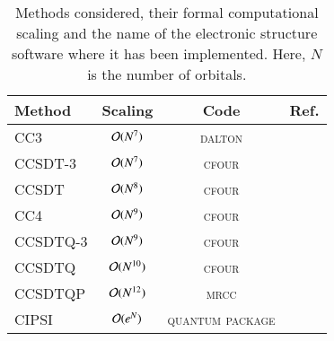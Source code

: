\documentclass[aip,jcp,reprint,noshowkeys,superscriptaddress]{revtex4-1}
\newcommand{\QP}{\textsc{quantum package}}
\newcommand{\MRCC}{\textsc{mrcc}}
\newcommand{\CFOUR}{\textsc{cfour}}
\newcommand{\DALTON}{\textsc{dalton}}
\begin{document}
\begin{table}
	\caption{Methods considered, their formal computational scaling and the name of the electronic structure software where it has been implemented.
	Here, $N$ is the number of orbitals.
	\label{tab:scaling}}
	\begin{ruledtabular}
	\begin{tabular}{lccc}
		Method	&	Scaling					&	Code		&	Ref.					\\
		\hline
		CC3			&	$\order*{N^{7}}$	&	\DALTON		&	\onlinecite{dalton}		\\
		CCSDT-3		&	$\order*{N^{7}}$	&	\CFOUR		&	\onlinecite{cfour}		\\
		CCSDT		&	$\order*{N^{8}}$	&	\CFOUR		&	\onlinecite{cfour}		\\
		CC4			&	$\order*{N^{9}}$	&	\CFOUR		&	\onlinecite{cfour}		\\
		CCSDTQ-3	&	$\order*{N^{9}}$	&	\CFOUR		&	\onlinecite{cfour}		\\
		CCSDTQ		&	$\order*{N^{10}}$	&	\CFOUR		&	\onlinecite{cfour}		\\
		CCSDTQP		&	$\order*{N^{12}}$	&	\MRCC		&	\onlinecite{mrcc}		\\	
		CIPSI		&	$\order*{e^{N}}$	&	\QP			&	\onlinecite{qp2}		\\
	\end{tabular}
	\end{ruledtabular}
\end{table}
\end{document}
